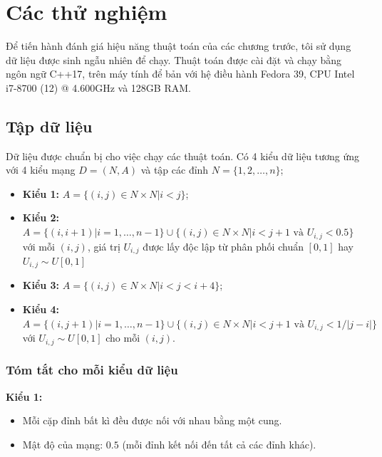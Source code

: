 \documentclass[../main.tex]{subfiles}
\begin{document}
\frontmatter
\pagestyle{empty}
\mainmatter
\pagestyle{fancy}
\chapter{Các thử nghiệm}\label{cuxe1c-thux1eed-nghiux1ec7m}

Để tiến hành đánh giá hiệu năng thuật toán của các chương trước, tôi sử
dụng dữ liệu được sinh ngẫu nhiên để chạy. Thuật toán được cài đặt và
chạy bằng ngôn ngữ C++17, trên máy tính để bản với hệ điều hành Fedora
39, CPU Intel i7-8700 (12) @ 4.600GHz và 128GB RAM.

\section{Tập dữ liệu}\label{tux1eadp-dux1eef-liux1ec7u}

Dữ liệu được chuẩn bị cho việc chạy các thuật toán. Có 4 kiểu dữ liệu
tương ứng với 4 kiểu mạng \(D=(N,A)\) và tập các đỉnh
\(N =\{1,2,\dots, n\}\);

\begin{itemize}
\tightlist
\item
  \textbf{Kiểu 1:} \(A = \{(i, j) \in N \times N | i < j \}\);
\item
  \textbf{Kiểu 2:}
  \(A = \{(i, i+1) | i = 1, \dots, n-1\} \cup \{(i, j) \in N \times N | i < j + 1 \text{ và } U_{i, j} < 0.5\}\)
  với mỗi \((i, j)\), giá trị \(U_{i, j}\) được lấy độc lập từ phân phối
  chuẩn \([0, 1]\) hay \(U_{i, j} \sim U[0,1]\)
\item
  \textbf{Kiểu 3:} \(A = \{(i, j) \in N \times N | i < j < i + 4 \}\);
\item
  \textbf{Kiểu 4:}
  \(A = \{(i, j+1) | i = 1, \dots, n-1\} \cup \{(i, j) \in N \times N | i < j +1 \text{ và } U_{i, j} < 1/ |j-i|\}\)
  với \(U_{i, j} \sim U[0,1]\) cho mỗi \((i, j)\).
\end{itemize}

\subsection{Tóm tắt cho mỗi kiểu dữ
liệu}\label{tuxf3m-tux1eaft-cho-mux1ed7i-kiux1ec3u-dux1eef-liux1ec7u}

\textbf{Kiểu 1:}

\begin{itemize}
\tightlist
\item
  Mỗi cặp đỉnh bất kì đều được nối với nhau bằng một cung.
\item
  Mật độ của mạng: \(0.5\) (mỗi đỉnh kết nối đến tất cả các đỉnh khác).
\end{itemize}
\end{document}
